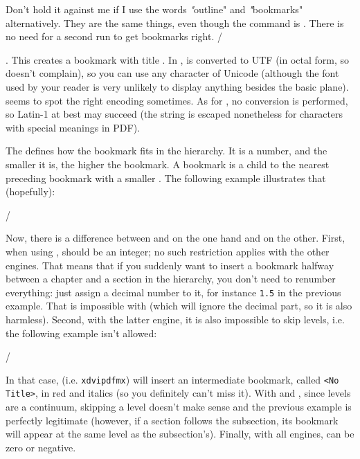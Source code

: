 \description
Don't hold it against me if I use the words \emph"outline" and
\emph"bookmarks" alternatively. They are the same things, even
though the command is \com\outline. There is no need for a second
run to get bookmarks right.
\description/

\describe\outline{}.
This creates a bookmark with title . In \luatex, 
is converted to UTF (in octal form, so \luatex doesn't
complain), so you can use any character of Unicode (although the
font used by your reader is very unlikely to display anything besides
the basic plane). \xetex seems to spot the right encoding sometimes.
As for \pdftex, no conversion is performed, so Latin-1 at best may
succeed (the string is escaped nonetheless for characters with special
meanings in PDF).

The  defines how the bookmark fits in the hierarchy. It
is a number, and the smaller it is, the higher the bookmark. A bookmark
is a child to the nearest preceding bookmark with a smaller .
The following example illustrates that (hopefully):

\verbatim
{}
\verbatim/

Now, there is a difference between \pdftex and \luatex on the one hand
and \xetex on the other. First, when using \xetex,  should be an
integer; no such restriction applies with the other engines. That means
that if you suddenly want to insert a bookmark halfway between a chapter
and a section in the hierarchy, you don't need to renumber everything:
just assign a decimal number to it, for instance \verb"1.5" in the previous
example. That is impossible with \xetex (which will ignore the decimal part,
so it is also harmless). Second, with the latter engine, it is also impossible
to skip levels, i.e. the following example isn't allowed:

\verbatim
{}
\verbatim/

In that case, \xetex (i.e. \verb"xdvipdfmx") will insert an intermediate
bookmark, called \verb"<No Title>", in red and italics (so you definitely
can't miss it). With \pdftex and \luatex, since levels are a continuum,
skipping a level doesn't make sense and the previous example is perfectly
legitimate (however, if a section follows the subsection, its bookmark
will appear at the same level as the subsection's). Finally, with all
engines,  can be zero or negative.

